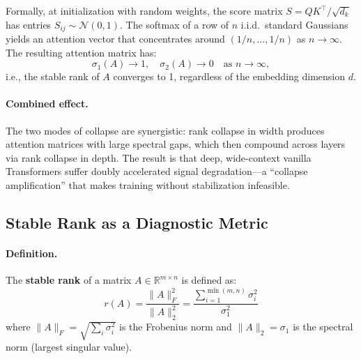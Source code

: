 \documentclass[12pt, a4paper]{article}
\begin{document}
Formally, at initialization with random weights, the score matrix
$S = QK^\top / \sqrt{d_k}$ has entries $S_{ij} \sim \mathcal{N}(0, 1)$.
The softmax of a row of $n$ i.i.d.\ standard Gaussians yields an
attention vector that concentrates around $(1/n, \ldots, 1/n)$ as
$n \to \infty$. The resulting attention matrix has:
\begin{equation}
    \sigma_1(A) \to 1, \quad \sigma_2(A) \to 0
    \quad \text{as } n \to \infty,
    \label{eq:width_collapse}
\end{equation}
i.e., the stable rank of $A$ converges to 1, regardless of the
embedding dimension $d$.

\paragraph{Combined effect.}
The two modes of collapse are synergistic: rank collapse in width
produces attention matrices with large spectral gaps, which then
compound across layers via rank collapse in depth. The result is that
deep, wide-context vanilla Transformers suffer doubly accelerated signal
degradation---a ``collapse amplification'' that makes training without
stabilization infeasible.

\subsection{Stable Rank as a Diagnostic Metric}

\paragraph{Definition.}
The \textbf{stable rank} of a matrix $A \in \mathbb{R}^{m \times n}$
is defined as:
\begin{equation}
    \boxed{\;
    r(A) = \frac{\|A\|_F^2}{\|A\|_2^2}
    = \frac{\sum_{i=1}^{\min(m,n)} \sigma_i^2}{\sigma_1^2}
    \;}
    \label{eq:stable_rank_def}
\end{equation}
where $\|A\|_F = \sqrt{\sum_{i} \sigma_i^2}$ is the Frobenius norm and
$\|A\|_2 = \sigma_1$ is the spectral norm (largest singular value).
\end{document}
